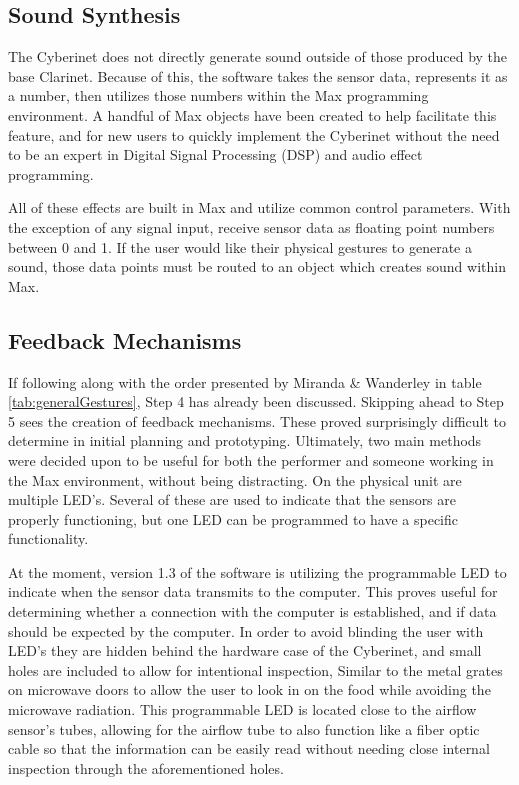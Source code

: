 \subsection{Sound Synthesis}

The Cyberinet does not directly generate sound outside of those produced by the base Clarinet. Because of this, the software takes the sensor data, represents it as a number, then utilizes those numbers within the Max programming environment. A handful of Max objects have been created to help facilitate this feature, and for new users to quickly implement the Cyberinet without the need to be an expert in Digital Signal Processing (DSP) and audio effect programming.

All of these effects are built in Max and utilize common control parameters. With the exception of any signal input, receive sensor data as floating point numbers between 0 and 1. If the user would like their physical gestures to generate a sound, those data points must be routed to an object which creates sound within Max.
 

\subsection{Feedback Mechanisms}
If following along with the order presented by Miranda \& Wanderley in table \ref{tab:generalGestures}, Step 4 has already been discussed. Skipping ahead to Step 5 sees the creation of feedback mechanisms. These proved surprisingly difficult to determine in initial planning and prototyping. Ultimately, two main methods were decided upon to be useful for both the performer and someone working in the Max environment, without being distracting. On the physical unit are multiple LED's. Several of these are used to indicate that the sensors are properly functioning, but one LED can be programmed to have a specific functionality. 

At the moment, version 1.3 of the software is utilizing the programmable LED to indicate when the sensor data transmits to the computer. This proves useful for determining whether a connection with the computer is established, and if data should be expected by the computer. In order to avoid blinding the user with LED's they are hidden behind the hardware case of the Cyberinet, and small holes are included to allow for intentional inspection, Similar to the metal grates on microwave doors to allow the user to look in on the food while avoiding the microwave radiation. This programmable LED is located close to the airflow sensor's tubes, allowing for the airflow tube to also function like a fiber optic cable so that the information can be easily read without needing close internal inspection through the aforementioned holes.

